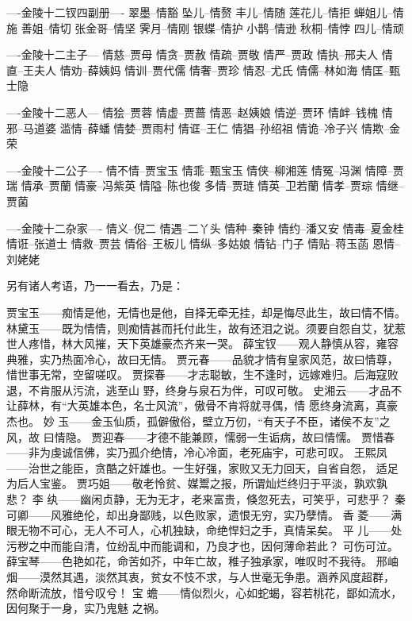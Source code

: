 \documentclass[12pt,oneside]{book}
\begin{document}
----金陵十二钗四副册----
翠墨--情豁 坠儿--情赘 丰儿--情随 莲花儿--情拒 蝉姐儿--情施 善姐--情切
张金哥--情坚 霁月--情刚 银蝶--情护 小鹊--情逊 秋桐--情悖 四儿--情顽 

----金陵十二主子---
情慈--贾母 情贪--贾赦 情疏--贾敬 情严--贾政 情执--邢夫人 情直--王夫人
情劝--薛姨妈 情训--贾代儒 情奢--贾珍 情忍--尤氏 情儒--林如海 情匡--甄士隐

----金陵十二恶人---
情狯--贾蓉 情虚--贾蔷 情恶--赵姨娘 情逆--贾环 情衅--钱槐 情邪--马道婆
滥情--薛蟠 情婪--贾雨村 情诓--王仁 情猖--孙绍祖 情诡--冷子兴 情欺--金荣 

----金陵十二公子----
情不情--贾宝玉 情乖--甄宝玉 情侠--柳湘莲 情冤--冯渊 情障--贾瑞 情承--贾蘭
情豪--冯紫英 情隘--陈也俊 多情--贾琏 情英--卫若蘭 情孝--贾琮 情继--贾菌 

----金陵十二杂家----
情义--倪二 情遇--二丫头 情种--秦钟 情约--潘又安 情毒--夏金桂 情诳--张道士
情救--贾芸 情俗--王板儿 情纵--多姑娘 情钻--门子 情贴--蒋玉菡 恩情--刘姥姥

另有诸人考语，乃一一看去，乃是： 

贾宝玉——痴情是他，无情也是他，自择无牵无挂，却是悔尽此生，故曰情不情。
林黛玉——既为情情，则痴情甚而托付此生，故有还泪之说。须要自怨自艾，犹惹
          世人疼惜，林大风摧，天下英雄豪杰齐来一哭。
薛宝钗——观人静慎从容，雍容典雅，实乃热面冷心，故曰无情。
贾元春——品貌才情有皇家风范，故曰情尊，惜世事无常，空留嗟叹。
贾探春——才志聪敏，生不逢时，远嫁难归。后海寇败退，不肯服从污流，逃至山
          野，终身与泉石为伴，可叹可敬。
史湘云——才品不让薛林，有“大英雄本色，名士风流”，傲骨不肯将就寻偶，情
          愿终身流离，真豪杰也。
妙  玉——金玉仙质，孤僻傲俗，壁立万仞，“有天子不臣，诸侯不友”之风，故
          曰情隐。
贾迎春——才德不能兼顾，懦弱一生诟病，故曰情懦。
贾惜春——非为虔诚信佛，实乃孤介绝情，冷心冷面，老死庙宇，可悲可叹。
王熙凤——治世之能臣，贪酷之奸雄也。一生好强，家败又无力回天，自省自怨，
          适足为后人宝鉴。 
贾巧姐——敬老怜贫、媒鬻之报，所谓灿烂终归于平淡，孰欢孰悲？
李  纨——幽闲贞静，无为无才，老来富贵，倏忽死去，可笑乎，可悲乎？
秦可卿——风雅绝伦，却出身鄙贱，以色败家，遗恨无穷，实乃孽情。
香  菱——满眼无物不可心，无人不可人，心机独缺，命绝悍妇之手，真情呆矣。
平  儿——处污秽之中而能自清，位纷乱中而能调和，乃良才也，因何薄命若此？
          可伤可泣。
薛宝琴——色艳如花，命苦如芥，中年亡故，稚子独承家，唯叹时不我待。
邢岫烟——漠然其遇，淡然其衷，贫女不忮不求，与人世毫无争患。涵养风度超群，
          然命断流放，惜兮叹兮！
宝  蟾——情似烈火，心如蛇蝎，容若桃花，鄙如流水，因何聚于一身，实乃鬼魅
之祸。
\end{document}
